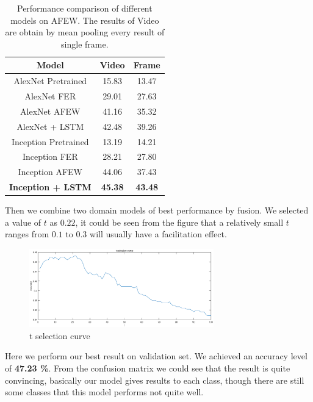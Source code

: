 \documentclass[10pt,twocolumn,letterpaper]{article}
\begin{document}
\begin{table}[t]
\begin{center}
\begin{tabular}{|c|c|c|}
\hline
\textbf{Model} & \textbf{Video} & \textbf{Frame} \\
\hline\hline
AlexNet Pretrained & 15.83 & 13.47 \\
AlexNet FER & 29.01 & 27.63 \\
AlexNet AFEW & 41.16 &  35.32 \\
AlexNet + LSTM & 42.48 & 39.26  \\ 
\hline \hline 
Inception Pretrained & 13.19 & 14.21 \\
Inception FER & 28.21 & 27.80 \\
Inception AFEW & 44.06 & 37.43 \\
\textbf{Inception + LSTM} & \textbf{45.38} & \textbf{43.48} \\



\hline
\end{tabular}
\end{center}
\caption{Performance comparison of different models on AFEW. The results of Video are obtain by mean pooling every result of single frame.}
\label{tableResult}

\end{table}

Then we combine two domain models of best performance by fusion. We selected a value of $t$ as $0.22$, it could be seen from the figure that a relatively small $t$ ranges from $0.1$ to $0.3$ will usually have a facilitation effect.

\begin{figure}[htpb]
	\centering
	\includegraphics[width = 8cm]{pic/t_selection.eps}
	\caption{t selection curve}
\end{figure}

Here we perform our best result on validation set. We achieved an accuracy level of \textbf{47.23 \%}. From the confusion matrix we could see that the result is quite convincing, basically our model gives results to each class, though there are still some classes that this model performs not quite well.
\end{document}

